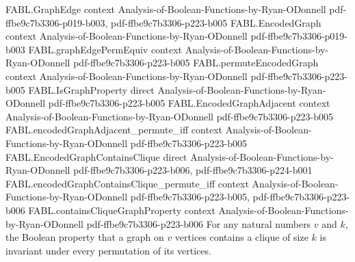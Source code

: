 \begin{theorem}
  {FABL.GraphEdge}
  {context}
  {Analysis-of-Boolean-Functions-by-Ryan-ODonnell}
  {pdf-ffbe9c7b3306-p019-b003,
    pdf-ffbe9c7b3306-p223-b005}
\proofstep
  {FABL.EncodedGraph}
  {context}
  {Analysis-of-Boolean-Functions-by-Ryan-ODonnell}
  {pdf-ffbe9c7b3306-p019-b003}
\proofstep
  {FABL.graphEdgePermEquiv}
  {context}
  {Analysis-of-Boolean-Functions-by-Ryan-ODonnell}
  {pdf-ffbe9c7b3306-p223-b005}
\proofstep
  {FABL.permuteEncodedGraph}
  {context}
  {Analysis-of-Boolean-Functions-by-Ryan-ODonnell}
  {pdf-ffbe9c7b3306-p223-b005}
\proofstep
  {FABL.IsGraphProperty}
  {direct}
  {Analysis-of-Boolean-Functions-by-Ryan-ODonnell}
  {pdf-ffbe9c7b3306-p223-b005}
\proofstep
  {FABL.EncodedGraphAdjacent}
  {context}
  {Analysis-of-Boolean-Functions-by-Ryan-ODonnell}
  {pdf-ffbe9c7b3306-p223-b005}
\proofstep
  {FABL.encodedGraphAdjacent_permute_iff}
  {context}
  {Analysis-of-Boolean-Functions-by-Ryan-ODonnell}
  {pdf-ffbe9c7b3306-p223-b005}
\proofstep
  {FABL.EncodedGraphContainsClique}
  {direct}
  {Analysis-of-Boolean-Functions-by-Ryan-ODonnell}
  {pdf-ffbe9c7b3306-p223-b006,
    pdf-ffbe9c7b3306-p224-b001}
\proofstep
  {FABL.encodedGraphContainsClique_permute_iff}
  {context}
  {Analysis-of-Boolean-Functions-by-Ryan-ODonnell}
  {pdf-ffbe9c7b3306-p223-b005,
    pdf-ffbe9c7b3306-p223-b006}
\proofstep
  {FABL.containsCliqueGraphProperty}
  {context}
  {Analysis-of-Boolean-Functions-by-Ryan-ODonnell}
  {pdf-ffbe9c7b3306-p223-b006}
For any natural numbers $v$ and $k$, the Boolean property that a graph on $v$ vertices
contains a clique of size $k$ is invariant under every permutation of its vertices.
\end{theorem}

